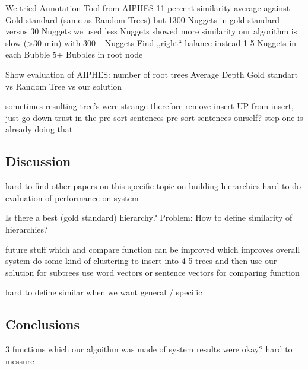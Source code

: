 We tried Annotation Tool from AIPHES
11 percent similarity average against Gold standard (same as Random Trees)
but
1300 Nuggets in gold standard versus 30 Nuggets we used
less Nuggets showed more similarity
our algorithm is slow (>30 min) with 300+ Nuggets
Find „right“ balance instead
1-5 Nuggets in each Bubble
5+ Bubbles in root node

Show evaluation of AIPHES:
	number of root trees
	Average Depth
	Gold standart vs Random Tree vs our solution

sometimes resulting tree's were strange
therefore remove insert UP from insert, just go down
trust in the pre-sort sentences
pre-sort sentences ourself? step one is already doing that

\subsection{Discussion}

hard to find other papers on this specific topic on building hierarchies
hard to do evaluation of performance on system

Is there a best (gold standard) hierarchy?
Problem: How to define similarity of hierarchies?

future stuff
which and compare function can be improved which improves overall system
do some kind of clustering to insert into 4-5 trees and then use our solution for subtrees
use word vectors or sentence vectors for comparing function

hard to define similar when we want general / specific

\subsection{Conclusions}

3 functions which our algoithm was made of
system results were okay?
hard to messure


